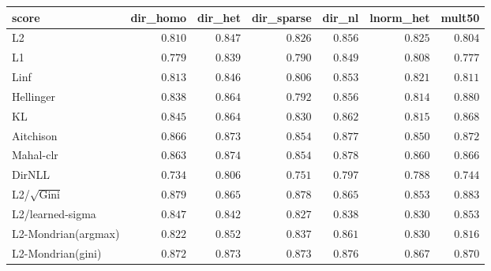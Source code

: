 \begin{tabular}{lrrrrrr}
\toprule
score & dir\_homo & dir\_het & dir\_sparse & dir\_nl & lnorm\_het & mult50 \\
\midrule
L2 & $0.810$ & $0.847$ & $0.826$ & $0.856$ & $0.825$ & $0.804$ \\
L1 & $0.779$ & $0.839$ & $0.790$ & $0.849$ & $0.808$ & $0.777$ \\
Linf & $0.813$ & $0.846$ & $0.806$ & $0.853$ & $0.821$ & $0.811$ \\
Hellinger & $0.838$ & $0.864$ & $0.792$ & $0.856$ & $0.814$ & $0.880$ \\
KL & $0.845$ & $0.864$ & $0.830$ & $0.862$ & $0.815$ & $0.868$ \\
Aitchison & $0.866$ & $0.873$ & $0.854$ & $0.877$ & $0.850$ & $0.872$ \\
Mahal-clr & $0.863$ & $\mathbf{0.874}$ & $0.854$ & $\mathbf{0.878}$ & $0.860$ & $0.866$ \\
DirNLL & $0.734$ & $0.806$ & $0.751$ & $0.797$ & $0.788$ & $0.744$ \\
L2/$\sqrt{\mathrm{Gini}}$ & $\mathbf{0.879}$ & $0.865$ & $\mathbf{0.878}$ & $0.865$ & $0.853$ & $\mathbf{0.883}$ \\
L2/learned-sigma & $0.847$ & $0.842$ & $0.827$ & $0.838$ & $0.830$ & $0.853$ \\
L2-Mondrian(argmax) & $0.822$ & $0.852$ & $0.837$ & $0.861$ & $0.830$ & $0.816$ \\
L2-Mondrian(gini) & $0.872$ & $0.873$ & $0.873$ & $0.876$ & $\mathbf{0.867}$ & $0.870$ \\
\bottomrule
\end{tabular}